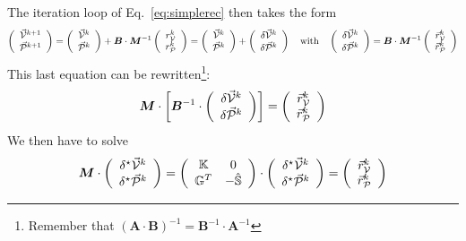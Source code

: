 The iteration loop of Eq.~\eqref{eq:simplerec} then takes the form 
\[
\left(
\begin{array}{c}
\vec{\cal V}^{k+1} \\ 
\vec{\cal P}^{k+1}
\end{array}
\right)
=
\left(
\begin{array}{c}
\vec{\cal V}^k \\ 
\vec{\cal P}^k
\end{array}
\right)
+ 
{\bm B}\cdot  {\bm M} ^{-1}
\left(
\begin{array}{c}
r_{\cal V}^k \\ r_{\cal P}^k
\end{array}
\right)
=
\left(
\begin{array}{c}
\vec{\cal V}^k \\ 
\vec{\cal P}^k
\end{array}
\right)
+ 
\left(
\begin{array}{c}
\delta \vec{\cal V}^k \\ 
\delta \vec{\cal P}^k
\end{array}
\right)
\quad
\textrm{with}\quad
\left(
\begin{array}{c}
\delta \vec{\cal V}^k \\ 
\delta \vec{\cal P}^k
\end{array}
\right)
=
{\bm B} \cdot {\bm M}^{-1}
\left(
\begin{array}{c}
\vec{r}_{\cal V}^k \\ 
\vec{r}_{\cal P}^k
\end{array}
\right)
\]
This last equation can be rewritten\footnote{Remember 
that $({\bm A}\cdot {\bm B})^{-1}={\bm B}^{-1}\cdot {\bm A}^{-1}$}:
\[
{\bm M} \cdot 
\left[ {\bm B}^{-1} \cdot 
\left(
\begin{array}{c}
\delta \vec{\cal V}^k \\ 
\delta \vec{\cal P}^k
\end{array}
\right)
\right]
=
\left(
\begin{array}{c}
\vec{r}_{\cal V}^k \\ 
\vec{r}_{\cal P}^k
\end{array}
\right)
\]
We then have to solve 
\begin{equation}
{\bm M} 
\cdot
\left(
\begin{array}{c}
\delta^\star \vec{\cal V}^k \\ 
\delta^\star \vec{\cal P}^k
\end{array}
\right)
=
\left(
\begin{array}{cc}
{\mathbb{K}} & 0 \\
{\mathbb{G}}^T & -\hat{{\mathbb{S}}}
\end{array}
\right)
\cdot
\left(
\begin{array}{c}
\delta^\star \vec{\cal V}^k \\ 
\delta^\star \vec{\cal P}^k
\end{array}
\right)
=
\left(
\begin{array}{c}
\vec{r}_{\cal V}^k \\ 
\vec{r}_{\cal P}^k
\end{array}
\right)
\label{simple1aa}
\end{equation}
